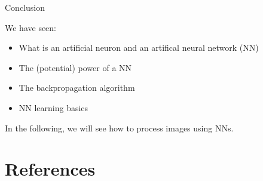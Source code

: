 \documentclass[xcolor=pdftex,dvipsnames,table,mathserif]{beamer}
\begin{document}


\begin{frame}{Conclusion}

  We have seen:
  \begin{itemize}
  \item What is an artificial neuron and an artifical neural network (NN)
  \item The (potential) power of a NN
  \item The backpropagation algorithm
  \item NN learning basics
  \end{itemize}

In the following, we will see how to process images using NNs.

\end{frame}


\section*{References}



\end{document}
